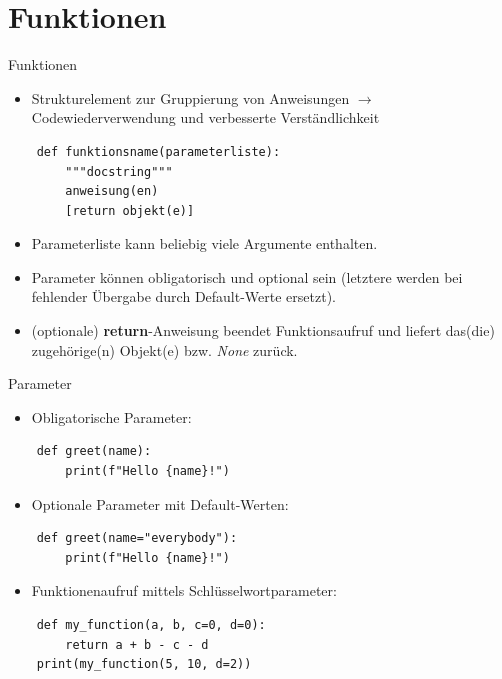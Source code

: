 \documentclass[utf8, smaller, c]{beamer}
\begin{document}
\section{Funktionen}
\begin{frame}{Funktionen}
	\begin{itemize}
		\item Strukturelement zur Gruppierung von Anweisungen $\rightarrow$ Codewiederverwendung und verbesserte Verständlichkeit
	\end{itemize}
	\begin{lstlisting}
	def funktionsname(parameterliste):
		"""docstring"""
		anweisung(en)
		[return objekt(e)]
	\end{lstlisting}
	\begin{itemize}
		\item Parameterliste kann beliebig viele Argumente enthalten.
		\item Parameter können obligatorisch und optional sein (letztere werden bei fehlender Übergabe durch Default-Werte ersetzt).
		\item (optionale) \textbf{return}-Anweisung beendet Funktionsaufruf und liefert das(die) zugehörige(n) Objekt(e) bzw. \textit{None} zurück.
	\end{itemize}
	
	\pagebreak
	
	\begin{block}{Parameter}
		\begin{itemize}
			\item Obligatorische Parameter:
		\end{itemize}
		\begin{lstlisting}
	def greet(name):
		print(f"Hello {name}!")
		\end{lstlisting}
		\begin{itemize}
			\item Optionale Parameter mit Default-Werten:
		\end{itemize}
		\begin{lstlisting}
	def greet(name="everybody"):
		print(f"Hello {name}!")
		\end{lstlisting}
		\begin{itemize}
			\item Funktionenaufruf mittels Schlüsselwortparameter:
		\end{itemize}
		\begin{lstlisting}
	def my_function(a, b, c=0, d=0):
		return a + b - c - d
	print(my_function(5, 10, d=2))
		\end{lstlisting}
	\end{block}
	

\end{frame}
\end{document}
